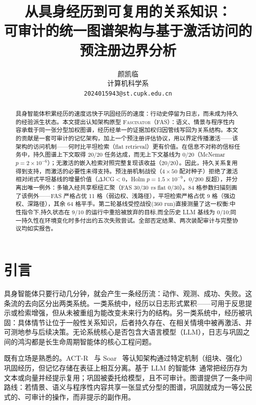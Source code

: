 \documentclass[10pt,a4paper]{ctexart}
\title{\bfseries 从具身经历到可复用的关系知识：\\
可审计的统一图谱架构与基于激活访问的\\
预注册边界分析}
\author{颜凯临\\ \small 计算机科学系\\ \small \texttt{2024015943@st.cupk.edu.cn}}
\date{}
\begin{document}
\maketitle

\begin{abstract}
具身智能体积累经历的速度远快于巩固经历的速度：行动史停留为日志，而未成为持久的经验派生状态。本文提出认知架构原型 \textsc{Fascinator}（FAS）：语义、情景与程序性内容承载于同一张分型加权图谱，经历经单一的证据加权归因管线写回为关系结构。本文的贡献是一套可审计的记忆架构，加上一个预注册评估协议，用以界定传播激活——该架构的访问机制——何时比平坦检索（flat retrieval）更有价值。在信息不对称的信标任务中，持久图谱上下文取得 20/20 任务达成，而无上下文基线为 0/20（McNemar $p{=}2\times10^{-6}$）；无激活的嵌入检索对照完整复现该收益（20/20）。因此，持久关系复用得到支持，而激活的必要性未得支持。预注册机制战役（$4\times50$ 配对种子）拒绝了激活相对闭式平坦基线的增量价值（$\Delta$JCG${<}0$，Holm $p{=}1.5\times10^{-9}$，0/200 反超），并分离出唯一例外：多输入经共享枢纽汇聚（FAS 30/30 \emph{vs} flat 0/30）。84 格参数扫描刻画了该例外——FAS 严格占优 11 格（弱边权、浅路径），平坦检索严格占优 9 格（强边权、深路径），其余 64 格平手。第二轮基线受控战役(360 run)直接测量了这一权衡:中性指令下,持久状态在 9/10 的运行中重拾被放弃的目标,而全历史 LLM 基线为 0/10;同一持久性在环境变化时多付出约五次失败尝试。全部否定结果、两次装配审计与完整协议均如实报告。
\end{abstract}

\section{引言}
\label{sec:intro}

具身智能体只要行动几分钟，就会产生一条经历流：动作、观测、成功、失败。这条流的去向区分出两类系统。一类系统中，经历以日志形式累积——可用于反思提示或检索增强，但从未被重组为能改变未来行为的结构。另一类系统中，经历被巩固：具体情节让位于一般性关系知识，后者持久存在、在相关情境中被再激活、并可测地参与后续决策。无论系统核心是否包含大语言模型（LLM），日志与巩固之间的鸿沟都是长生命周期智能体的核心工程问题。

既有立场是熟悉的。ACT-R~\citep{anderson2004integrated} 与 Soar~\citep{laird2012soar} 等认知架构通过特定机制（组块、强化）巩固经历，但记忆存储在表征上相互分离。基于 LLM 的智能体~\citep{yao2023react,park2023generative,shinn2023reflexion}通常把经历存为文本或向量并经提示复用；巩固被委托给模型，且不可审计。图谱提供了一条中间路线：若情景、语义与程序性内容共享一张显式分型的图谱，巩固就成为一等公民式的、可审计的操作，而非提示的副作用。
\end{document}
